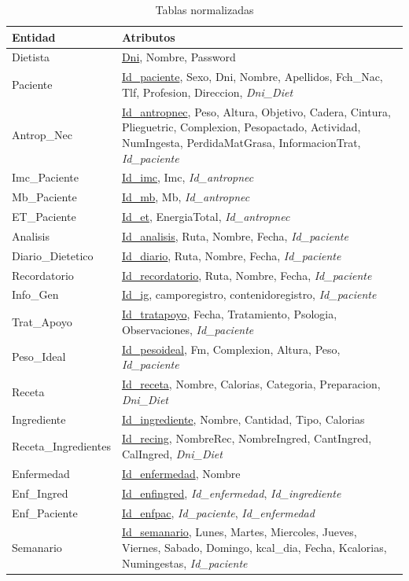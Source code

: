 \begin{table}[H]
\begin{center}
  \begin{tabular}{| l | p{12cm} |}
    \hline
    Entidad & Atributos \\ \hline
    Dietista & \underline{Dni}, Nombre, Password \\ \hline
    Paciente & \underline{Id\_paciente},  Sexo, Dni, Nombre, Apellidos, Fch\_Nac, Tlf, Profesion, Direccion, \textit{Dni\_Diet} \\ \hline
	Antrop\_Nec & \underline{Id\_antropnec}, Peso, Altura, Objetivo, Cadera, Cintura, Plieguetric, Complexion, Pesopactado, Actividad, NumIngesta, PerdidaMatGrasa, InformacionTrat, \textit{Id\_paciente} \\ \hline
	Imc\_Paciente & \underline{Id\_imc}, Imc, \textit{Id\_antropnec} \\ \hline
	Mb\_Paciente & \underline{Id\_mb}, Mb, \textit{Id\_antropnec} \\ \hline
	ET\_Paciente & \underline{Id\_et}, EnergiaTotal, \textit{Id\_antropnec} \\ \hline
	Analisis & \underline{Id\_analisis}, Ruta, Nombre, Fecha, \textit{Id\_paciente} \\ \hline
	Diario\_Dietetico & \underline{Id\_diario}, Ruta, Nombre, Fecha, \textit{Id\_paciente} \\ \hline
	Recordatorio & \underline{Id\_recordatorio}, Ruta, Nombre, Fecha, \textit{Id\_paciente} \\ \hline
	Info\_Gen & \underline{Id\_ig}, camporegistro, contenidoregistro, \textit{Id\_paciente} \\ \hline
	Trat\_Apoyo & \underline{Id\_tratapoyo}, Fecha, Tratamiento, Psologia, Observaciones, \textit{Id\_paciente} \\ \hline
	Peso\_Ideal & \underline{Id\_pesoideal}, Fm, Complexion, Altura, Peso, \textit{Id\_paciente} \\ \hline
	Receta & \underline{Id\_receta}, Nombre, Calorias, Categoria, Preparacion, \textit{Dni\_Diet} \\ \hline
	Ingrediente & \underline{Id\_ingrediente}, Nombre, Cantidad, Tipo, Calorias \\ \hline
	Receta\_Ingredientes & \underline{Id\_recing}, NombreRec, NombreIngred, CantIngred, CalIngred, \textit{Dni\_Diet} \\ \hline
	Enfermedad & \underline{Id\_enfermedad}, Nombre \\ \hline
	Enf\_Ingred & \underline{Id\_enfingred}, \textit{Id\_enfermedad}, \textit{Id\_ingrediente} \\ \hline
	Enf\_Paciente & \underline{Id\_enfpac}, \textit{Id\_paciente}, \textit{Id\_enfermedad} \\ \hline
	Semanario & \underline{Id\_semanario}, Lunes, Martes, Miercoles, Jueves, Viernes, Sabado, Domingo, kcal\_dia, Fecha, Kcalorias, Numingestas, \textit{Id\_paciente} \\
	\hline
  \end{tabular}
\end{center}
\caption{Tablas normalizadas}
\end{table}

